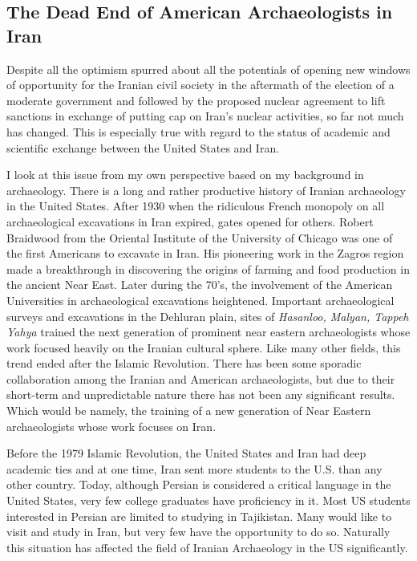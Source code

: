 \subsection{The Dead End of American Archaeologists in
Iran}\label{the-dead-end-of-american-archaeologists-in-iran}

Despite all the optimism spurred about all the potentials of opening new
windows of opportunity for the Iranian civil society in the aftermath of
the election of a moderate government and followed by the proposed
nuclear agreement to lift sanctions in exchange of putting cap on Iran's
nuclear activities, so far not much has changed. This is especially true
with regard to the status of academic and scientific exchange between
the United States and Iran.

I look at this issue from my own perspective based on my background in
archaeology. There is a long and rather productive history of Iranian
archaeology in the United States. After 1930 when the ridiculous French
monopoly on all archaeological excavations in Iran expired, gates opened
for others. Robert Braidwood from the Oriental Institute of the
University of Chicago was one of the first Americans to excavate in
Iran. His pioneering work in the Zagros region made a breakthrough in
discovering the origins of farming and food production in the ancient
Near East. Later during the 70's, the involvement of the American
Universities in archaeological excavations heightened. Important
archaeological surveys and excavations in the Dehluran plain, sites of
\emph{Hasanloo, Malyan, Tappeh Yahya} trained the next generation of
prominent near eastern archaeologists whose work focused heavily on the
Iranian cultural sphere. Like many other fields, this trend ended after
the Islamic Revolution. There has been some sporadic collaboration among
the Iranian and American archaeologists, but due to their short-term and
unpredictable nature there has not been any significant results. Which
would be namely, the training of a new generation of Near Eastern
archaeologists whose work focuses on Iran.

Before the 1979 Islamic Revolution, the United States and Iran had deep
academic ties and at one time, Iran sent more students to the U.S. than
any other country. Today, although Persian is considered a critical
language in the United States, very few college graduates have
proficiency in it. Most US students interested in Persian are limited to
studying in Tajikistan. Many would like to visit and study in Iran, but
very few have the opportunity to do so. Naturally this situation has
affected the field of Iranian Archaeology in the US significantly.

